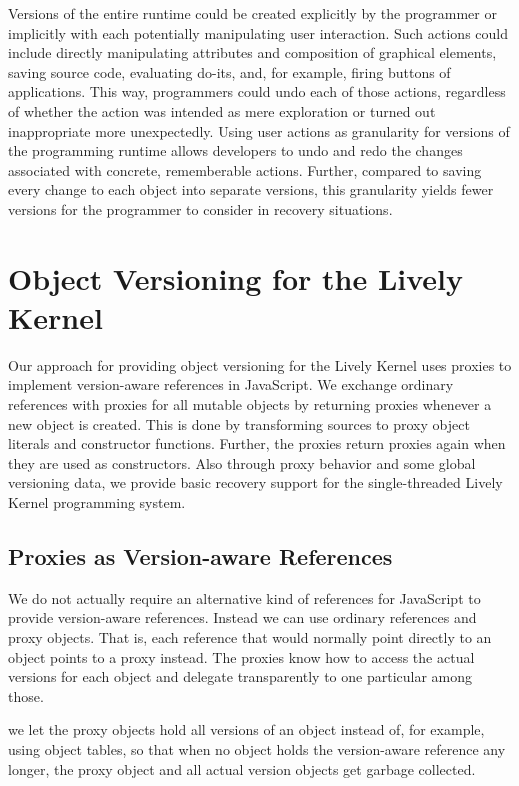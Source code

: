 Versions of the entire runtime could be created explicitly by the programmer or implicitly with each potentially manipulating user interaction.
Such actions could include directly manipulating attributes and composition of graphical elements, saving source code, evaluating do-its, and, for example, firing buttons of applications.
This way, programmers could undo each of those actions, regardless of whether the action was intended as mere exploration or turned out inappropriate more unexpectedly.
Using user actions as granularity for versions of the programming runtime allows developers to undo and redo the changes associated with concrete, rememberable actions.
Further, compared to saving every change to each object into separate versions, this granularity yields fewer versions for the programmer to consider in recovery situations.



\section{Object Versioning for the Lively Kernel} \label{sec:APPROACH:2}

Our approach for providing object versioning for the Lively Kernel uses proxies to implement version-aware references in JavaScript.
We exchange ordinary references with proxies for all mutable objects by returning proxies whenever a new object is created.
This is done by transforming sources to proxy object literals and constructor functions.
Further, the proxies return proxies again when they are used as constructors.
Also through proxy behavior and some global versioning data, we provide basic recovery support for the single-threaded Lively Kernel programming system.


\subsection{Proxies as Version-aware References}

We do not actually require an alternative kind of references for JavaScript to provide version-aware references.
Instead we can use ordinary references and proxy objects.
That is, each reference that would normally point directly to an object points to a proxy instead.
The proxies know how to access the actual versions for each object and delegate transparently to one particular among those.

we let the proxy objects hold all versions of an object instead of, for example, using object tables, so that when no object holds the version-aware reference any longer, the proxy object and all actual version objects get garbage collected.

